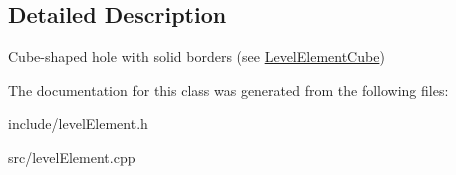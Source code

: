 \subsection{\-Detailed \-Description}
\-Cube-\/shaped hole with solid borders (see \hyperlink{classLevelElementCube}{\-Level\-Element\-Cube}) 

\-The documentation for this class was generated from the following files\-:\begin{DoxyCompactItemize}
\item 
include/level\-Element.\-h\item 
src/level\-Element.\-cpp\end{DoxyCompactItemize}
